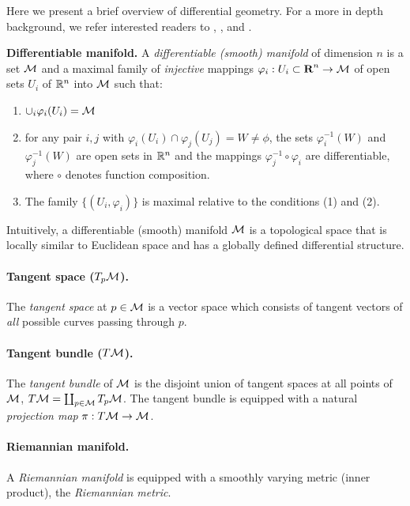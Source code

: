 Here we present a brief overview of differential geometry. For a more in depth background, we refer interested readers to \cite{do1992riemannian}, \cite{lee2003smooth}, and \cite{spivak1981comprehensive}.


\textbf{Differentiable manifold.}
A \textit{differentiable (smooth) manifold} of dimension $n$ is a set $\mathcal{M}$ and a maximal family of \textit{injective} mappings $\varphi_{i}:U_{i}
\subset \textbf{R}^{n} \rightarrow \mathcal{M}$ of open sets $U_{i}$ of
$\mathbb{R}^{n}$ into $\mathcal{M}$ such that:
\begin{enumerate}
\item $\cup_{i}\varphi_{i}(U_{i}) =\mathcal{M}$
\item for any pair $i,j$ with $\varphi_{i} (U_{i}) \cap
\varphi_{j} (U_{j}) = W \neq \phi$, the sets $\varphi_{i}^{-1}(W)$
and $\varphi_{j}^{-1}(W)$ are open sets in $\mathbb{R}^{n}$ and the
mappings $\varphi_{j}^{-1} \circ \varphi_{i}$ are
differentiable, where $\circ$ denotes function composition. 
\item The family $\{(U_{i},\varphi_{i})\}$ is maximal relative to
the conditions (1) and (2). 
\end{enumerate}

Intuitively, a differentiable (smooth) manifold $\mathcal{M}$ is a topological
space that is locally similar to Euclidean space and has a globally
defined differential structure. 

\paragraph{Tangent space ($T_{p}\mathcal{M}$).} The \textit{tangent space} at $p \in \mathcal{M}$ is a vector space which consists of 
tangent vectors of \textit{all} possible curves passing through $p$. 

\paragraph{Tangent bundle ($T\mathcal{M}$).} The \textit{tangent bundle} of $\mathcal{M}$ is the disjoint union of tangent spaces at all points of $\mathcal{M}$, 
$T\mathcal{M} = \coprod_{p \in \mathcal{M}}T_{p}\mathcal{M}$. 
The tangent bundle is equipped with a natural \textit{projection map} $\pi: T\mathcal{M} \rightarrow \mathcal{M}$. 

\paragraph{Riemannian manifold.} A \textit{Riemannian manifold} is 
equipped with a
smoothly varying metric (inner product), the \textit{Riemannian metric}. 

